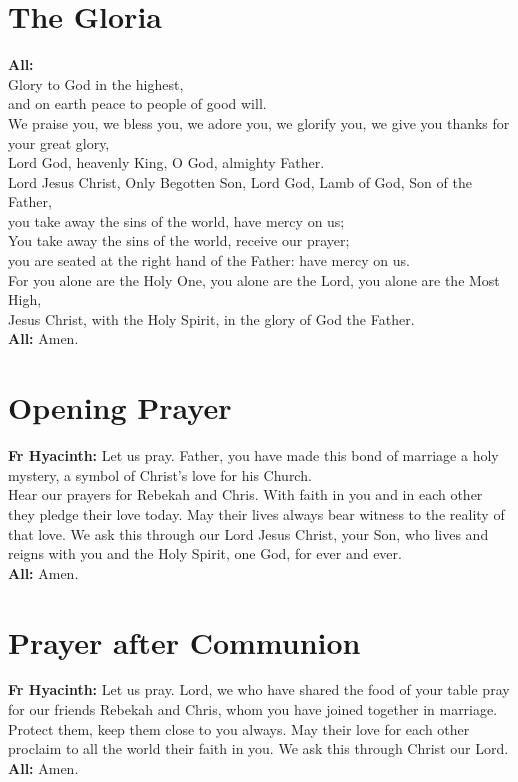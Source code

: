 \documentclass[12pt,landscape]{article}
\begin{document}
\newpage
\begin{multicols}{2}

\section*{The Gloria}
\textbf{All:}\\
Glory to God in the highest,\\
and on earth peace to people of good will.\\[0.5em]
We praise you, we bless you, we adore you, we glorify you, we give you thanks for your great glory,\\
Lord God, heavenly King, O God, almighty Father.\\[0.5em]
Lord Jesus Christ, Only Begotten Son, Lord God, Lamb of God, Son of the Father,\\
you take away the sins of the world, have mercy on us;\\
You take away the sins of the world, receive our prayer;\\
you are seated at the right hand of the Father: have mercy on us.\\[0.5em]
For you alone are the Holy One, you alone are the Lord, you alone are the Most High,\\
Jesus Christ, with the Holy Spirit, in the glory of God the Father.\\[0.5em]
\textbf{All:} Amen.

\section*{Opening Prayer}
\textbf{Fr Hyacinth:} Let us pray. Father, you have made this bond of marriage a holy mystery, a symbol of Christ's love for his Church.\\[0.5em]
Hear our prayers for Rebekah and Chris. With faith in you and in each other they pledge their love today. May their lives always bear witness to the reality of that love. We ask this through our Lord Jesus Christ, your Son, who lives and reigns with you and the Holy Spirit, one God, for ever and ever.\\[0.5em]
\textbf{All:} Amen.

\section*{Prayer after Communion}
\textbf{Fr Hyacinth:} Let us pray. Lord, we who have shared the food of your table pray for our friends Rebekah and Chris, whom you have joined together in marriage. Protect them, keep them close to you always. May their love for each other proclaim to all the world their faith in you. We ask this through Christ our Lord.\\[0.5em]
\textbf{All:} Amen.


\end{multicols}
\end{document}
